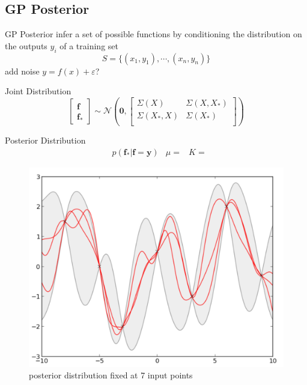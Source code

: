 \documentclass[xcolor=x11names,compress]{beamer}
\begin{document}
    \subsection{GP Posterior}
    \begin{frame}{GP Posterior}
        infer a set of possible functions by conditioning the distribution on the outputs $y_{i}$ of a training set
        \begin{equation*}
            S = \{(x_{1}, y_{1}), \cdots, (x_{n},y_{n})\}
        \end{equation*}
        add noise $y = f(x) + \varepsilon$?
    \end{frame}


\begin{frame}{Joint Distribution}
\begin{equation*}
\begin{bmatrix}\textbf{f}\\\textbf{f}_{*}\end{bmatrix}
\sim \mathcal{N}\left(\textbf{0},
\begin{bmatrix}
    \Sigma(X) & \Sigma(X,X_{*})\\
    \Sigma(X_{*},X) & \Sigma(X_{*})\\
\end{bmatrix}
\right)
\end{equation*}
\end{frame}

\begin{frame}{Posterior Distribution}
\begin{align*}
 & p(\textbf{f}_{*}\vert\textbf{f} =\textbf{y})
 & \mu = 
 & K = 
\end{align*}

\begin{figure}
\centering
\includegraphics[width=.6\textwidth]{../resources/figures/gp_posterior.pdf}
\caption{posterior distribution fixed at 7 input points}
\end{figure}
\end{frame}
\end{document}
